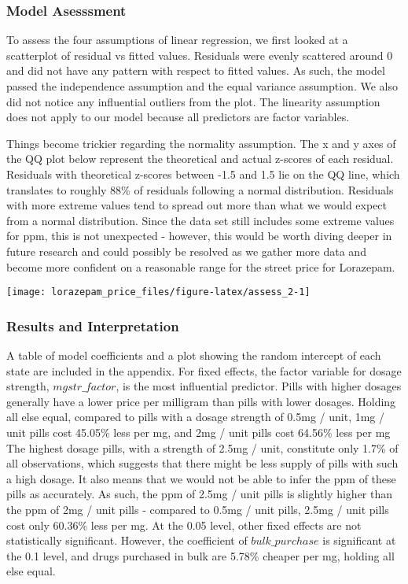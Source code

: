\documentclass[
]{article}
\begin{document}
\hypertarget{model-asesssment}{%
\subsubsection{Model Asesssment}\label{model-asesssment}}

To assess the four assumptions of linear regression, we first looked at
a scatterplot of residual vs fitted values. Residuals were evenly
scattered around 0 and did not have any pattern with respect to fitted
values. As such, the model passed the independence assumption and the
equal variance assumption. We also did not notice any influential
outliers from the plot. The linearity assumption does not apply to our
model because all predictors are factor variables.

Things become trickier regarding the normality assumption. The x and y
axes of the QQ plot below represent the theoretical and actual z-scores
of each residual. Residuals with theoretical z-scores between -1.5 and
1.5 lie on the QQ line, which translates to roughly 88\% of residuals
following a normal distribution. Residuals with more extreme values tend
to spread out more than what we would expect from a normal distribution.
Since the data set still includes some extreme values for ppm, this is
not unexpected - however, this would be worth diving deeper in future
research and could possibly be resolved as we gather more data and
become more confident on a reasonable range for the street price for
Lorazepam.

\begin{center}\texttt{[image: lorazepam\_price\_files/figure-latex/assess\_2-1]} \end{center}

\hypertarget{results-and-interpretation}{%
\subsubsection{Results and
Interpretation}\label{results-and-interpretation}}

A table of model coefficients and a plot showing the random intercept of
each state are included in the appendix. For fixed effects, the factor
variable for dosage strength, \(mgstr\_factor\), is the most influential
predictor. Pills with higher dosages generally have a lower price per
milligram than pills with lower dosages. Holding all else equal,
compared to pills with a dosage strength of 0.5mg / unit, 1mg / unit
pills cost 45.05\% less per mg, and 2mg / unit pills cost 64.56\% less
per mg The highest dosage pills, with a strength of 2.5mg / unit,
constitute only 1.7\% of all observations, which suggests that there
might be less supply of pills with such a high dosage. It also means
that we would not be able to infer the ppm of these pills as accurately.
As such, the ppm of 2.5mg / unit pills is slightly higher than the ppm
of 2mg / unit pills - compared to 0.5mg / unit pills, 2.5mg / unit pills
cost only 60.36\% less per mg. At the 0.05 level, other fixed effects
are not statistically significant. However, the coefficient of
\(bulk\_purchase\) is significant at the 0.1 level, and drugs purchased
in bulk are 5.78\% cheaper per mg, holding all else equal.
\end{document}
